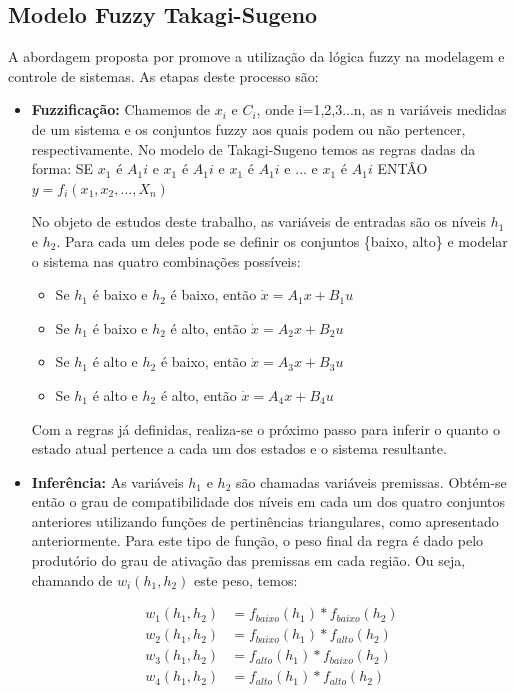\subsection{Modelo Fuzzy Takagi-Sugeno}
A abordagem proposta por \cite{takagi_sugeno} promove a utilização da lógica fuzzy na modelagem e controle de sistemas. As etapas deste processo são:
\begin{itemize}
	
	\item \textbf{Fuzzificação:}
	Chamemos de $x_{i}$ e $C_{i}$, onde i=1,2,3...n, as n variáveis medidas de um sistema e os conjuntos fuzzy aos quais podem ou não pertencer, respectivamente. No modelo de Takagi-Sugeno temos as regras dadas da forma:
	SE $x_1$ é $A_1i$ e $x_1$ é $A_1i$ e $x_1$ é $A_1i$ e ... e $x_1$ é $A_1i$ ENTÂO $y = f_i(x_1, x_2, ..., X_n)$
	
	No objeto de estudos deste trabalho, as variáveis de entradas são os níveis $h_1$ e $h_2$. Para cada um deles pode se definir os conjuntos \{baixo, alto\} e modelar o sistema nas quatro combinações possíveis:
	\begin{itemize}
		\item Se $h_1$ é baixo e $h_2$ é baixo, então $\dot{x} = A_{1}x + B_{1}u$
		\item Se $h_1$ é baixo e $h_2$ é alto, então $\dot{x} = A_{2}x + B_{2}u$
		\item Se $h_1$ é alto e $h_2$ é baixo, então $\dot{x} = A_{3}x + B_{3}u$
		\item Se $h_1$ é alto e $h_2$ é alto, então $\dot{x} = A_{4}x + B_{4}u$
	\end{itemize}
	
	Com a regras já definidas, realiza-se o próximo passo para inferir o quanto o estado atual pertence a cada um dos estados e o sistema resultante.
	
	\item \textbf{Inferência:}
	As variáveis $h_1$ e $h_2$ são chamadas variáveis premissas. Obtém-se então o grau de compatibilidade dos níveis em cada um dos quatro conjuntos anteriores utilizando funções de pertinências triangulares, como apresentado anteriormente. Para este tipo de função, o peso final da regra é dado pelo produtório do grau de ativação das premissas em cada região. Ou seja, chamando de $w_i(h_1,h_2)$ este peso, temos:
	
	\begin{align*}
		w_1(h_1,h_2) &= f_{baixo}(h_1)*f_{baixo}(h_2) \\
		w_2(h_1,h_2) &= f_{baixo}(h_1)*f_{alto}(h_2) \\
		w_3(h_1,h_2) &= f_{alto}(h_1)*f_{baixo}(h_2) \\
		w_4(h_1,h_2) &= f_{alto}(h_1)*f_{alto}(h_2) \\
	\end{align*}
	

\end{itemize}
